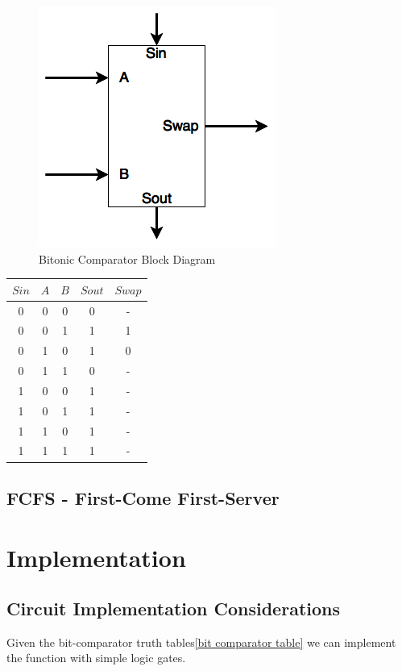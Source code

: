 \documentclass[11pt]{scrartcl}
\begin{document}
\begin{figure}[hbtp]
\centering
\includegraphics[scale=.8]{BitonicComparator_BlockDiagram.png}
\caption{Bitonic Comparator Block Diagram}
\end{figure}



\begin{table}
\centering
\begin{tabular}{ c | c | c || c | c  }
$Sin$ & $A$ & $B$ & $Sout$ & $Swap$  \\
\hline
0 & 0 & 0 & 0 & - \\
0 & 0 & 1 & 1 & 1 \\
0 & 1 & 0 & 1 & 0 \\
0 & 1 & 1 & 0 & - \\
1 & 0 & 0 & 1 & - \\
1 & 0 & 1 & 1 & - \\
1 & 1 & 0 & 1 & - \\
1 & 1 & 1 & 1 & - \\
\end{tabular}
 \label{tab:title} 
\end{table}

\subsection{FCFS - First-Come First-Server}


\section{Implementation}
\subsection{Circuit Implementation Considerations}
Given the bit-comparator truth tables\ref{bit comparator table} we can implement the function with simple logic gates.
\end{document}
